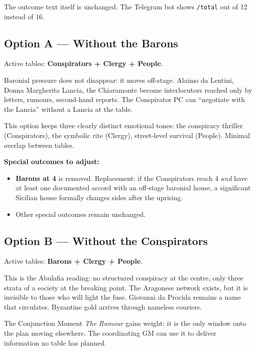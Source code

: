 The outcome text itself is unchanged. The Telegram bot shows
\texttt{/total} out of 12 instead of 16.

\secsep

\subsection{Option A --- Without the Barons}

Active tables: \textbf{Conspirators + Clergy + People}.

Baronial pressure does not disappear: it moves off-stage. Alaimo
da Lentini, Donna Margherita Lancia, the Chiaramonte become
interlocutors reached only by letters, rumours, second-hand
reports. The Conspirator PC can ``negotiate with the Lancia''
without a Lancia at the table.

This option keeps three clearly distinct emotional tones: the
conspiracy thriller (Conspirators), the symbolic rite (Clergy),
street-level survival (People). Minimal overlap between tables.

\textbf{Special outcomes to adjust:}
\begin{itemize}[nosep]
  \item \textbf{Barons at 4} is removed. Replacement: if the
    Conspirators reach 4 \textit{and} have at least one documented
    accord with an off-stage baronial house, a significant Sicilian
    house formally changes sides after the uprising.
  \item Other special outcomes remain unchanged.
\end{itemize}

\secsep

\subsection{Option B --- Without the Conspirators}

Active tables: \textbf{Barons + Clergy + People}.

This is the Abulafia reading: no structured conspiracy at the
centre, only three strata of a society at the breaking point.
The Aragonese network exists, but it is invisible to those who
will light the fuse. Giovanni da Procida remains a name that
circulates. Byzantine gold arrives through nameless couriers.

The Conjunction Moment \textit{The Rumour} gains weight: it is
the only window onto the plan moving elsewhere. The coordinating
GM can use it to deliver information no table has planned.

